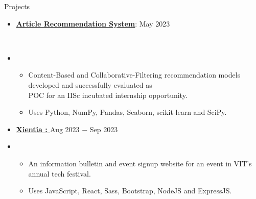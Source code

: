 \documentclass{resume}
\begin{document}
\begin{rSection}{Projects}
\begin{itemize}[label=\null, leftmargin=*, parsep=0.5em]
        \item {
              \parbox{\linewidth}{\textbf{\href{https://github.com/AdwayB/aiaceszt-Article-Recommendation}{\underline{Article Recommendation System}}}: \hfill May 2023}
              } \\
        \item {
              \vspace{-1.2\baselineskip}
              \begin{itemize}[label=$\bullet$]
                  \vspace{-\parskip}
                  \vspace{-\parsep}
                  \item {
                        Content-Based and Collaborative-Filtering recommendation models developed and successfully evaluated as \\
                        POC for an IISc incubated internship opportunity.
                        }
                  \item {
                        Uses Python, NumPy, Pandas, Seaborn, scikit-learn and SciPy.
                        }
              \end{itemize}
              }


        \item {
              \textbf{\href{https://github.com/SIGMA-XI-VIT/Xientia2023}{\underline{Xientia} : }}\hfill Aug 2023 $-$ Sep 2023
              } \\
        \item {
              \vspace{-1.2\baselineskip}
              \begin{itemize}[label=$\bullet$]
                  \vspace{-\parskip}
                  \vspace{-\parsep}
                  \item {
                        An information bulletin and event signup website for an event in VIT’s annual tech festival.
                        }
                  \item {
                        Uses JavaScript, React, Sass, Bootstrap, NodeJS and ExpressJS.\@
                        }
              \end{itemize}
              }
    \end{itemize}
\end{rSection}


\vspace{-0.5\baselineskip}
\end{document}
